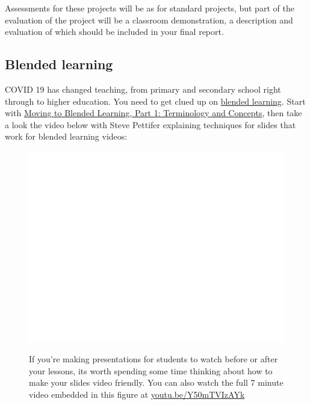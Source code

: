 \documentclass[
  12pt,
]{book}
\begin{document}
Assessments for these projects will be as for standard projects, \citep{COMP30030, COMP30040} but part of the evaluation of the project will be a classroom demonstration, a description and evaluation of which should be included in your final report.

\hypertarget{blended}{%
\subsection{Blended learning}\label{blended}}

COVID 19 has changed teaching, from primary and secondary school right through to higher education. You need to get clued up on \href{https://en.wikipedia.org/wiki/Blended_learning}{blended learning}. Start with \href{http://www.elearning.fse.manchester.ac.uk/fseta/moving-to-blended-learning-part-1-terminology-and-concepts/}{Moving to Blended Learning, Part 1: Terminology and Concepts}, then take a look the video below with Steve Pettifer explaining techniques for slides that work for blended learning videos:

\begin{figure}

{\centering \href{https://www.youtube.com/embed/Y50mTVIzAYk}{\includegraphics[width=0.99\linewidth]{duncan-hull_files/figure-latex/srp-fig-1} }

}

\caption{If you're making presentations for students to watch before or after your lessons, its worth spending some time thinking about how to make your slides video friendly. You can also watch the full 7 minute video embedded in this figure at \href{https://youtu.be/Y50mTVIzAYk}{youtu.be/Y50mTVIzAYk} \citep{youtube-srp}}\label{fig:srp-fig}
\end{figure}
\end{document}
